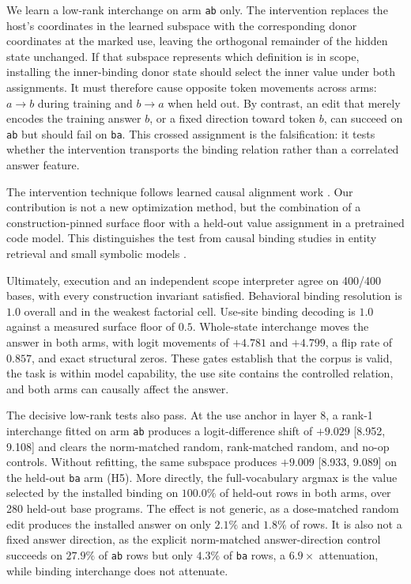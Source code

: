 \documentclass{article}
\begin{document}
We learn a low-rank interchange on arm \texttt{ab} only. The intervention replaces the host's coordinates in the learned subspace with the corresponding donor coordinates at the marked use, leaving the orthogonal remainder of the hidden state unchanged. If that subspace represents which definition is in scope, installing the inner-binding donor state should select the inner value under both assignments. It must therefore cause opposite token movements across arms: $a\rightarrow b$ during training and $b\rightarrow a$ when held out. By contrast, an edit that merely encodes the training answer $b$, or a fixed direction toward token $b$, can succeed on \texttt{ab} but should fail on \texttt{ba}. This crossed assignment is the falsification: it tests whether the intervention transports the binding relation rather than a correlated answer feature.

The intervention technique follows learned causal alignment work \citep{geiger2023alignments,wu2023boundless,huang2024ravel}. Our contribution is not a new optimization method, but the combination of a construction-pinned surface floor with a held-out value assignment in a pretrained code model. This distinguishes the test from causal binding studies in entity retrieval and small symbolic models \citep{feng2024binding,wu2025variablebinding}.

Ultimately, execution and an independent scope interpreter agree on 400/400 bases, with every construction invariant satisfied. Behavioral binding resolution is $1.0$ overall and in the weakest factorial cell. Use-site binding decoding is $1.0$ against a measured surface floor of $0.5$. Whole-state interchange moves the answer in both arms, with logit movements of $+4.781$ and $+4.799$, a flip rate of $0.857$, and exact structural zeros. These gates establish that the corpus is valid, the task is within model capability, the use site contains the controlled relation, and both arms can causally affect the answer.

The decisive low-rank tests also pass. At the use anchor in layer 8, a rank-1 interchange fitted on arm \texttt{ab} produces a logit-difference shift of $+9.029$ [8.952, 9.108] and clears the norm-matched random, rank-matched random, and no-op controls. Without refitting, the same subspace produces $+9.009$ [8.933, 9.089] on the held-out \texttt{ba} arm (H5). More directly, the full-vocabulary argmax is the value selected by the installed binding on $100.0\%$ of held-out rows in both arms, over 280 held-out base programs. The effect is not generic, as a dose-matched random edit produces the installed answer on only $2.1\%$ and $1.8\%$ of rows. It is also not a fixed answer direction, as the explicit norm-matched answer-direction control succeeds on $27.9\%$ of \texttt{ab} rows but only $4.3\%$ of \texttt{ba} rows, a $6.9\times$ attenuation, while binding interchange does not attenuate.
\end{document}
